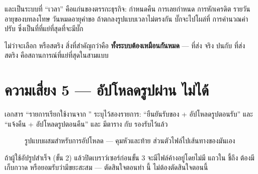 และเป็นระบบที่ ``เวลา'' คือแก่นของตรรกะธุรกิจ: กำหนดคืน การเลยกำหนด การหักเครดิต
รายวัน อายุของบทลงโทษ วันหมดอายุคำขอ ถ้าตกลงรูปแบบเวลาไม่ตรงกัน บั๊กจะไปโผล่ที่
การคำนวณค่าปรับ ซึ่งเป็นที่ที่แย่ที่สุดที่จะมีบั๊ก

\begin{keybox}[title={ตกลงครั้งเดียว เขียนลงตารางสัญญา แล้วห้ามมีข้อยกเว้น}]
ไม่ว่าจะเลือก  หรือสตริง  สิ่งที่สำคัญกว่าคือ
\textbf{ทั้งระบบต้องเหมือนกันหมด} ---  ที่ส่ง  จริง
ปนกับ  ที่ส่งสตริง คือสถานการณ์ที่แย่ที่สุดในสามแบบ
\end{keybox}

\section{ความเสี่ยง 5 --- อัปโหลดรูปผ่าน  ไม่ได้}

เอกสาร ``รายการเรียกใช้งานจาก '' ระบุไว้สองรายการ: ``ยืนยันรับของ +
อัปโหลดรูปตอนรับ'' และ ``แจ้งคืน + อัปโหลดรูปตอนคืน'' และ 
มีตาราง  กับ  รองรับไว้แล้ว

\begin{figure}[H]
\centering
{}
\caption{รูปแบบผสมสำหรับการอัปโหลด ---  คุมหัวและท้าย ส่วนตัวไฟล์ไปเส้นทางของมันเอง}
\end{figure}

\begin{warnbox}[title={จุดที่ต้องคิดต่อ: ไฟล์ที่อัปแล้วแต่ไม่มีใครอ้างถึง}]
ถ้าผู้ใช้อัปรูปสำเร็จ (ขั้น 2) แล้วปิดเบราว์เซอร์ก่อนขั้น 3 จะมีไฟล์ค้างอยู่โดยไม่มี
แถวใน  ชี้ถึง ต้องมี  เก็บกวาด หรือยอมรับว่ามีขยะสะสม ---
ตัดสินใจตอนทำ  นี้ ไม่ต้องตัดสินใจตอนนี้
\end{warnbox}

